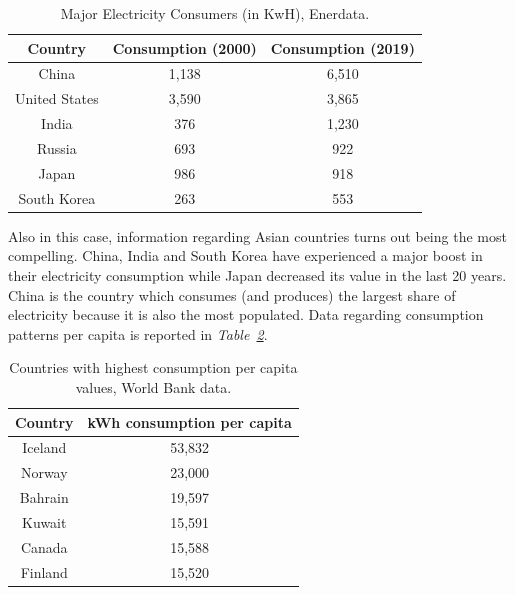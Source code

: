 \documentclass[a4paper,12pt]{book}
\begin{document}
\begin{table}[hbt]
\begin{center}
\begin{tabular}{|c|c|c|}
\hline
Country & Consumption (2000) & Consumption (2019)\\
\hline
China & 1,138 & 6,510\\
United States & 3,590 & 3,865\\
India & 376 & 1,230\\
Russia & 693 & 922\\
Japan & 986 & 918\\
South Korea & 263 & 553\\
\hline
\end{tabular}
\caption{Major Electricity Consumers (in KwH), Enerdata.}
\label{Tab:producers}
\end{center}
\end{table}

Also in this case, information regarding Asian countries turns out being the most compelling. China, India and South Korea have experienced a major boost in their electricity consumption while Japan decreased its value in the last 20 years. China is the country which consumes (and produces) the largest share of electricity because it is also the most populated. Data regarding consumption patterns per capita is reported in \textit{Table~\ref{Tab:cons}}.

\begin{table}[hbt]
\begin{center}
\begin{tabular}{|c|c|}
\hline
Country & kWh consumption per capita\\
\hline
Iceland & 53,832\\
Norway & 23,000\\
Bahrain & 19,597\\
Kuwait & 15,591\\
Canada & 15,588\\
Finland & 15,520\\
\hline
\end{tabular}
\caption{Countries with highest consumption per capita values, World Bank data.}
\label{Tab:cons}
\end{center}
\end{table}
\end{document}
